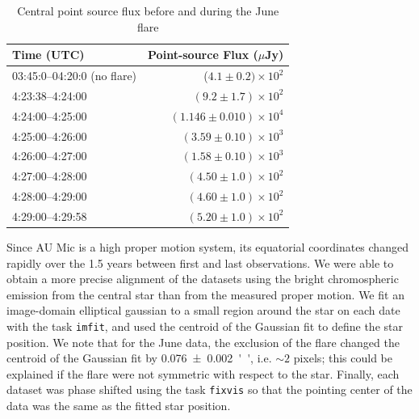 \documentclass[12pt,oneside]{article}
\begin{document}
\begin{table}	
  \centering
	\caption{Central point source flux before and during the June flare}
  \label{tab:flare fluxes}
  \begin{tabular}{lr}
    \toprule
    Time (UTC) & Point-source Flux ($\mu$Jy) \\
    \midrule
    03:45:0--04:20:0 (no flare) & ($4.1 \pm 0.2)  \times 10^2$\\
  	4:23:38--4:24:00 & $(9.2 \pm 1.7) \times 10^2$ \\
  	4:24:00--4:25:00 & $(1.146 \pm 0.010) \times 10^4$ \\
  	4:25:00--4:26:00 & $(3.59 \pm 0.10) \times 10^3$ \\
  	4:26:00--4:27:00 & $(1.58 \pm 0.10) \times 10^3$ \\
  	4:27:00--4:28:00 & $(4.50 \pm 1.0) \times 10^2$ \\
  	4:28:00--4:29:00 & $(4.60 \pm 1.0) \times 10^2$ \\
  	4:29:00--4:29:58 & $(5.20 \pm 1.0) \times 10^2$\\
    \bottomrule
  \end{tabular}
\end{table}


Since AU Mic is a high proper motion system, its equatorial coordinates changed rapidly over the 1.5 years between first and last observations.  
We were able to obtain a more precise alignment of the datasets using the bright chromospheric emission from the central star than from the measured proper motion.
We fit an image-domain elliptical gaussian to a small region around the star on each date with the task \texttt{imfit}, and used the centroid of the Gaussian fit to define the star position.
We note that for the June data, the exclusion of the flare changed the centroid of the Gaussian fit by \SI{.076 \pm 0.002}{''}, i.e. $\sim 2$ pixels; this could be explained if the flare were not symmetric with respect to the star.
Finally, each dataset was phase shifted using the task \texttt{fixvis} so that the pointing center of the data was the same as the fitted star position.
\end{document}
